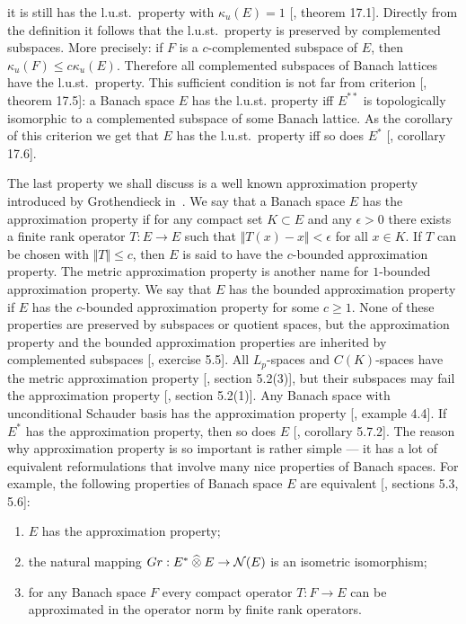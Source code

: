 it is still has the l.u.st.\ property with $\kappa_u(E)=1$
[\cite{DiestAbsSumOps}, theorem 17.1]. Directly from the definition it follows
that the l.u.st.\ property is preserved by complemented subspaces. More
precisely: if $F$ is a $c$-complemented subspace of $E$, 
then $\kappa_u(F)\leq c\kappa_u(E)$. 
Therefore all complemented subspaces of Banach lattices have the
l.u.st.\ property. This sufficient condition is not far from criterion
[\cite{DiestAbsSumOps}, theorem 17.5]: a Banach space $E$ has the l.u.st.
property iff $E^{**}$ is topologically isomorphic to a complemented subspace of
some Banach lattice. As the corollary of this criterion we get that $E$ has the
l.u.st.\ property iff so does $E^*$ [\cite{DiestAbsSumOps}, corollary 17.6].

The last property we shall discuss is a well known approximation property
introduced by Grothendieck in~\cite{GrothProdTenTopNucl}. We say that a Banach
space $E$ has the approximation property if for any compact set $K\subset E$ and
any $\epsilon>0$ there exists a finite rank operator $T:E\to E$ such 
that $\Vert T(x)-x\Vert<\epsilon$ for all $x\in K$. If $T$ can be 
chosen with $\Vert T\Vert\leq c$, then $E$ is said to have the $c$-bounded
approximation property. The metric approximation property is another name for
$1$-bounded approximation property. We say that $E$ has the bounded
approximation property if $E$ has the $c$-bounded approximation property for
some $c\geq 1$. None of these properties are preserved by subspaces or quotient
spaces, but the approximation property and the bounded approximation properties
are inherited by complemented subspaces [\cite{DefFloTensNorOpId}, exercise
5.5]. All $L_p$-spaces and $C(K)$-spaces have the metric approximation property
[\cite{DefFloTensNorOpId}, section 5.2(3)], but their subspaces may fail the
approximation property [\cite{DefFloTensNorOpId}, section 5.2(1)]. Any Banach
space with unconditional Schauder basis has the approximation property
[\cite{RyanIntroTensNormsBanSp}, example 4.4]. If $E^*$ has the approximation
property, then so does $E$ [\cite{DefFloTensNorOpId}, corollary 5.7.2]. The
reason why approximation property is so important is rather simple --- it has a
lot of equivalent reformulations that involve many nice properties of Banach
spaces. For example, the following properties of Banach space $E$ are equivalent
[\cite{DefFloTensNorOpId}, sections 5.3, 5.6]:
\begin{enumerate}[label = (\roman*)]
  \item $E$ has the approximation property;

  \item the natural mapping $Gr:E^*\mathbin{\widehat{\otimes}} E\to\mathcal{N}(E)$ is an isometric
  isomorphism;

  \item for any Banach space $F$ every compact operator $T:F\to E$ can be
  approximated in the operator norm by finite rank operators.
\end{enumerate}

